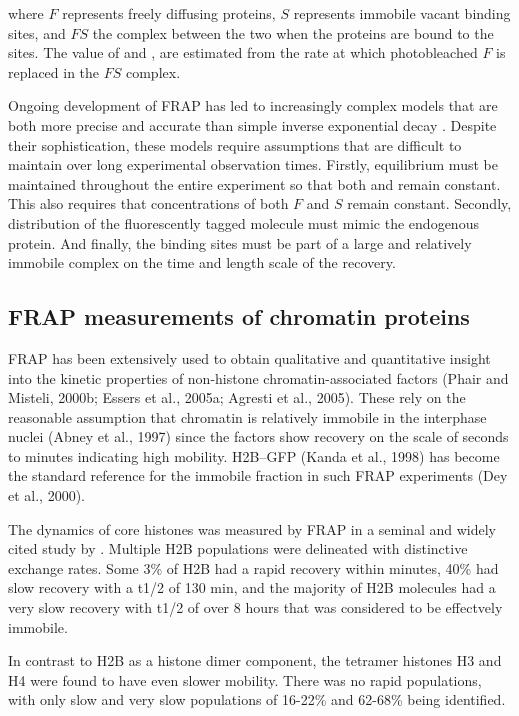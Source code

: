     where $F$ represents freely diffusing proteins, 
    $S$ represents immobile vacant binding sites, 
    and $FS$ the complex between the two when the proteins are bound to the sites. 
    The value of \Kon{} and \Koff{},
    are estimated from the rate at which photobleached $F$ is replaced in the $FS$ complex.

    Ongoing development of FRAP has led to increasingly complex models
    that are both more precise and accurate than simple inverse exponential decay .
    Despite their sophistication, these models require assumptions
    that are difficult to maintain over long experimental observation times.
    Firstly, equilibrium must be maintained throughout the entire experiment 
    so that both \Kon{} and \Koff{} remain constant.
    This also requires that concentrations of both $F$ and $S$ remain constant.
    Secondly, distribution of the fluorescently tagged molecule must mimic the endogenous protein.
    And finally, the binding sites must be part of a large and relatively immobile complex
    on the time and length scale of the recovery.

  \subsection{FRAP measurements of chromatin proteins}

    FRAP has been extensively used to obtain qualitative and quantitative insight 
    into the kinetic properties of non-histone chromatin-associated factors 
    (Phair and Misteli, 2000b; Essers et al., 2005a; Agresti et al., 2005). 
    These rely on the reasonable assumption that chromatin is 
    relatively immobile in the interphase nuclei (Abney et al., 1997)
    since the factors show recovery on the scale of seconds to minutes indicating high mobility.
    H2B–GFP (Kanda et al., 1998) has become the standard reference 
    for the immobile fraction in such FRAP experiments (Dey et al., 2000).

    The dynamics of core histones was measured by FRAP 
    in a seminal and widely cited study by \citet{KimuraCook}.
    Multiple H2B populations were delineated with distinctive exchange rates.
    Some 3\% of H2B had a rapid recovery within minutes, 
    40\% had slow recovery with a t1/2 of 130 min, 
    and the majority of H2B molecules had a very slow recovery with t1/2 of over 8 hours
    that was considered to be effectvely immobile.

    In contrast to H2B as a histone dimer component,
    the tetramer histones H3 and H4 were found to have even slower mobility.
    There was no rapid populations, with only slow and very slow populations 
    of 16-22\% and 62-68\% being identified.
    
